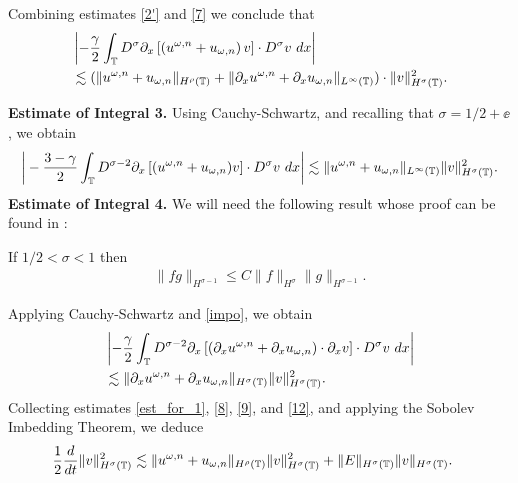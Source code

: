 %
%
Combining estimates \eqref{2'} and \eqref{7} we conclude that
%
%
\begin{equation}
\begin{split}
& \left | -\frac{\gamma}{2} \int_{\mathbb{T}} D^\sigma \partial_x \left[ \left( 
u^{\omega,n} + u_{\omega,n}
\right)v \right]  \cdot D^\sigma v \ dx \right |
\\
& \lesssim (\|u^{\omega,n} + u_{\omega,n}\|_{H^{\rho}(\mathbb{T})} + \|\partial_x 
u^{\omega,n} +
\partial_x u_{\omega,n}\|_{L^\infty(\mathbb{T})} ) \cdot \|v\|_{H^\sigma(\mathbb{T})}^2.
\label{8}
\end{split}
\end{equation}
%
%
%

\textbf{Estimate of Integral 3.} Using Cauchy-Schwartz, and recalling that
$\sigma = 1/2 + \ee$,  we obtain
%
%
\begin{equation}
\begin{split}
\bigg | -\frac{3-\gamma}{2} \int_{\mathbb{T}} D^{\sigma -2} \partial_x \left[
(u^{\omega,n} + u_{\omega,n})v \right]
\cdot D^\sigma v \ dx \bigg |
\lesssim \|u^{\omega,n} + u_{\omega,n} \|_{L^\infty(\mathbb{T})} 
\|v\|_{H^\sigma(\mathbb{T})}^2.
\label{9}
\end{split}
\end{equation}
%
%
%
\textbf{Estimate of Integral 4.}
We will need the following result whose proof can be found in 
\cite{Himonas_2009_Non-uniform-dep-per}:
%
%
%
\begin{lemma}
\label{impo}
If  $1/2 < \sigma < 1 $ then
%
%
\begin{equation}
\begin{split}
\|fg\|_{H^{\sigma - 1}} \le C \|f\|_{H^{\sigma}}
\|g\|_{H^{\sigma -1}}.
\label{11}
\end{split}
\end{equation}
%
%
\end{lemma}
%
Applying Cauchy-Schwartz and  \cref{impo}, we obtain
%
%
\begin{equation}
\begin{split}
& \left | -\frac{\gamma}{2} \int_{\mathbb{T}} D^{\sigma -2 } \partial_x \left[
\left( \partial_x u^{\omega,n} + \partial_x u_{\omega,n} \right) \cdot \partial_x v
\right] \cdot D^\sigma v \ dx \right |
\\
& \lesssim \|\partial_x u^{\omega,n} + \partial_x u_{\omega,n}
\|_{H^\sigma(\mathbb{T})} \|v\|_{H^\sigma(\mathbb{T})}^2.
\label{12}
\end{split}
\end{equation}
%
%
Collecting estimates \eqref{est_for_1}, \eqref{8}, \eqref{9}, and
\eqref{12}, and applying the Sobolev Imbedding Theorem, we deduce
%
%
\begin{equation}
\begin{split}
\frac{1}{2}\frac{d}{dt} \|v\|_{H^\sigma(\mathbb{T})}^2
& \lesssim
\|u^{\omega,n} + u_{\omega,n}\|_{H^{\rho}(\mathbb{T})} \|v\|_{H^\sigma(\mathbb{T})}^2
+ \|E\|_{H^\sigma(\mathbb{T})}
\|v\|_{H^\sigma(\mathbb{T})}.
\label{10}
\end{split}
\end{equation}
